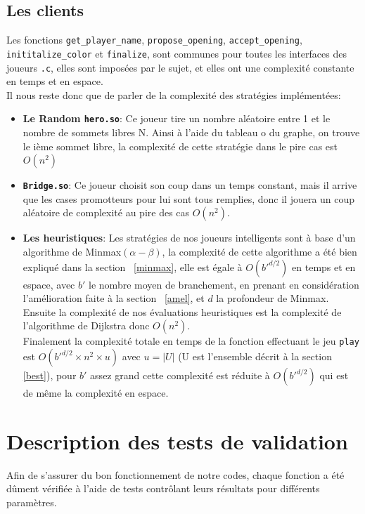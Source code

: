 \documentclass[a4paper,10pt]{article}
\begin{document}
\subsection{Les clients}
Les fonctions \texttt{get\_player\_name}, \texttt{propose\_opening}, \texttt{accept\_opening}, \texttt{inititalize\_color} et \texttt{finalize}, sont communes pour toutes les interfaces des joueurs \texttt{.c}, elles sont imposées par le sujet, et elles ont une complexité constante en temps et en espace.\\
Il nous reste donc que de parler de la complexité des stratégies implémentées:
\begin{itemize}
    \item \textbf{Le Random \texttt{hero.so}}: Ce joueur tire un nombre aléatoire entre 1 et le nombre de sommets libres N. Ainsi à l’aide du tableau o du graphe, on trouve le ième sommet libre, la complexité de cette stratégie  dans le pire cas est $O(n^2)$
    \item \textbf{\texttt{Bridge.so}}: Ce joueur choisit son coup dans un temps constant, mais il arrive que les cases promotteurs pour lui sont tous remplies, donc il jouera un coup aléatoire de complexité au pire des cas $O(n^2)$.
    \item \textbf{Les heuristiques}: Les stratégies de nos joueurs intelligents sont à base d'un algorithme de Minmax$(\alpha-\beta)$, la complexité de cette algorithme a été bien expliqué dans la section ~\ref{minmax}, elle est égale à $O(b'^{d/2})$ en temps et en espace, avec $b'$ le nombre moyen de branchement, en prenant en considération l'amélioration faite à la section ~\ref{amel}, et $d$ la profondeur de Minmax.\\
    Ensuite la complexité de nos évaluations heuristiques est la complexité de l'algorithme de Dijkstra donc $O(n^2)$.\\
    Finalement la complexité totale en temps de la fonction effectuant le jeu \texttt{play} est $O(b'^{d/2} \times n^2 \times u)$ avec $u = |U|$ (U est l'ensemble décrit à la section \ref{best}), pour $b'$ assez grand cette complexité est réduite à $O(b'^{d/2})$ qui est de même la complexité en espace.

\end{itemize}
\section{Description des tests de validation}
Afin de s'assurer du bon fonctionnement de notre codes, chaque fonction a été dûment vérifiée à l'aide de tests contrôlant leurs résultats pour différents paramètres.
\end{document}

